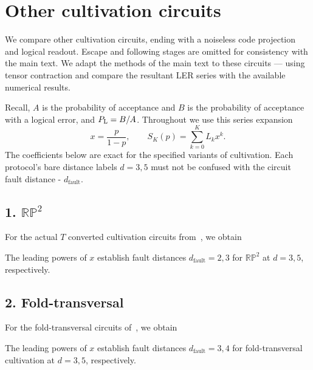 \section{Other cultivation circuits}
\label{app:other-cultivation}
\captionsetup{hypcap=false}

We compare other cultivation circuits, ending with a
noiseless code projection and logical readout. Escape and following
stages are omitted for consistency with the main text. We adapt the methods
of the main text to these circuits --- using tensor contraction and compare the resultant LER series with the 
available numerical results.

Recall, $A$ is the probability of acceptance and $B$ is the probability of
acceptance with a logical error, and $P_{\mathrm L}=B/A$. Throughout we use this series expansion
\[
 x=\frac{p}{1-p},\qquad S_K(p)=\sum_{k=0}^{K}L_kx^k.
\]
The coefficients below are exact for the specified variants of cultivation. Each protocol's bare distance labels $d=3,5$ must not be confused with the circuit fault distance - $d_\text{fault}$.

\subsection*{1. \texorpdfstring{$\mathbb{RP}^{2}$}{RP2}}

For the actual $T$ converted cultivation circuits from~\cite{RP2_prxq}, we obtain


The leading powers of $x$ establish fault distances $d_{\text{fault}}=2,3$
for $\mathbb{RP}^{2}$ at $d=3,5$, respectively.


\subsection*{2. Fold-transversal}

For the fold-transversal circuits of~\cite{fold_msc_prxq}, we obtain


The leading powers of $x$ establish fault distances $d_{\text{fault}}=3,4$
for fold-transversal cultivation at $d=3,5$, respectively.


